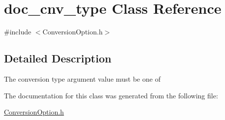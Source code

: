 \hypertarget{classdoc__cnv__type}{}\section{doc\+\_\+cnv\+\_\+type Class Reference}
\label{classdoc__cnv__type}


{\ttfamily \#include $<$Conversion\+Option.\+h$>$}



\subsection{Detailed Description}
\begin{DoxyParagraph}{}
The conversion {\ttfamily type} argument value must be one of 
\end{DoxyParagraph}


The documentation for this class was generated from the following file\+:\begin{DoxyCompactItemize}
\item 
\hyperlink{_conversion_option_8h}{Conversion\+Option.\+h}\end{DoxyCompactItemize}
